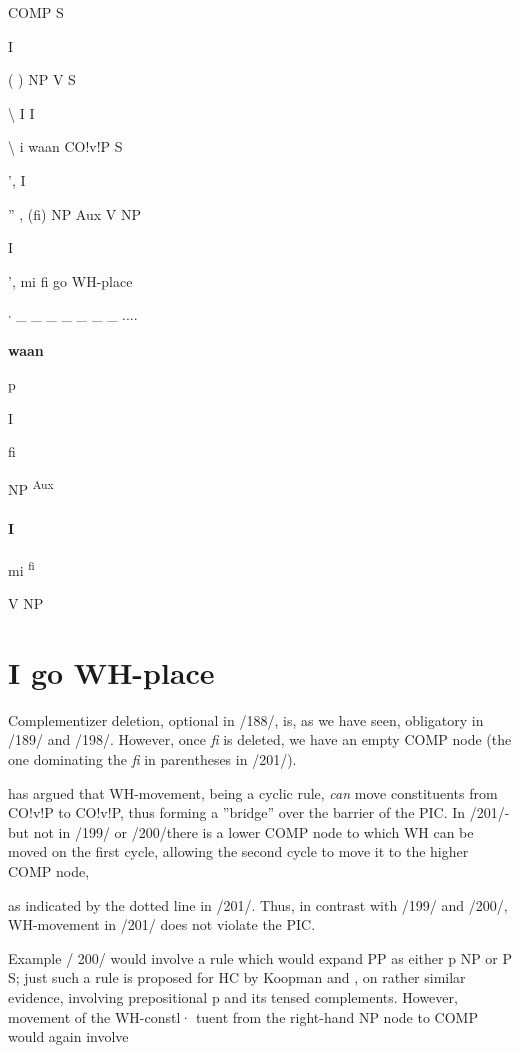 COMP S

I

( ) NP V S

{\textbackslash} I I

{\textbackslash} i waan CO!v!P S

', I

'' , (fi) NP Aux V NP 

I

', mi fi go WH-place

\textsubscript{' }\_ \_ \_ \_ \_ \_ \_ ....

\bfseries
waan

p

I

fi

NP \textsuperscript{Aux} 

\paragraph{I}

mi \textsuperscript{fi}

V NP

\section{I go WH-place}



Complementizer deletion, optional in /188/, is, as we have seen, obliga\-tory in /189/ and /198/. However, once \textit{fi} is deleted, we have an empty COMP node (the one dominating the \textit{fi} in parentheses in /201/).

\citet{Chomsky1977} has argued that WH-movement, being a cyclic rule, \textit{can} move constituents from CO!v!P to CO!v!P, thus forming a ''bridge'' over the barrier of the PIC. In /201/-but not in /199/ or /200/\-there is a lower COMP node to which WH can be moved on the first cycle, allowing the second cycle to move it to the higher COMP node,

as indicated by the dotted line in /201/. Thus, in contrast with /199/ and /200/, WH-movement in /201/ does not violate the PIC.

Example / 200/ would involve a rule which would expand PP as either p NP or P S; just such a rule is proposed for HC by Koopman and \citet{Lefebvre1981}, on rather similar evidence, involving prepositional p and its tensed complements. However, movement of the WH-constl· tuent from the right-hand NP node to COMP would again involve

